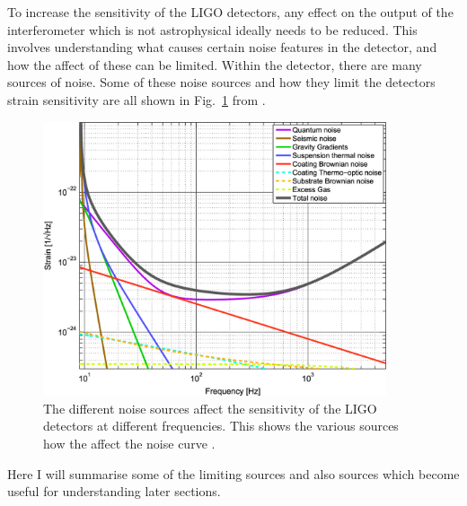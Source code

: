 To increase the sensitivity of the \gls{LIGO} detectors, any effect on the output of the interferometer which is not astrophysical ideally needs to be reduced.
This involves understanding what causes certain noise features in the detector, and how the affect of these can be limited. 
Within the detector, there are many sources of noise.
Some of these noise sources and how they limit the detectors strain sensitivity are all shown in Fig.~\ref{detectors:noisesensitivity} from \citep{aasi2015AdvancedLIGO}.
\begin{figure}[h]
    \centering
    \includegraphics[width=0.9\textwidth]{C1_intro/noise_sensitivity.jpg}
    \caption{The different noise sources affect the sensitivity of the \gls{LIGO} detectors at different frequencies. This shows the various sources how the affect the noise curve \citep{aasi2015AdvancedLIGO}.}
    \label{detectors:noisesensitivity}
\end{figure}
Here I will summarise some of the limiting sources and also sources which become useful for understanding later sections.


